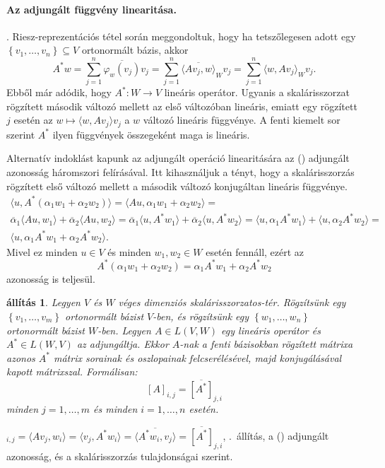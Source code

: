 \documentclass[9pt, a4paper, showtrims]{memoir}
\makeatletter
\let\Aref\relax
\renewenvironment{proof}[1][\proofname]
    {\par\pushQED{\qed}%
    \normalfont \topsep6\p@\@plus6\p@\relax
    \trivlist
    \item[\hskip\labelsep
        \itshape
    #1\@addpunct{:}]\ignorespaces}
    {\popQED\endtrivlist\@endpefalse}
\theoremstyle{plain}
\newtheorem{proposition}{állítás}[chapter]
\theoremstyle{remark}
\theoremstyle{definition}
\newcommand{\ip}[2]{\langle#1,#2\rangle}
\makeatother
\begin{document}
\paragraph{Az adjungált függvény linearitása.}
\Aref{pr:Riesz}. Riesz-reprezentációs tétel során meggondoltuk,
hogy ha tetszőlegesen adott egy
$\left\{ v_1,\ldots,v_n \right\}\subseteq V$
ortonormált bázis, akkor
\[
	A^\ast w
	=
	\sum_{j=1}^n\overline{\varphi_w\left( v_j \right)}v_j
	=
	\sum_{j=1}^n\overline{\ip{Av_j}{w}}_Wv_j
	=
	\sum_{j=1}^n\ip{w}{Av_j}_Wv_j.
\]
Ebből már adódik, hogy $A^\ast:W\to V$ lineáris operátor.
Ugyanis a skalárisszorzat rögzített második változó mellett az első változóban lineáris,
emiatt egy rögzített $j$ esetén az $w\mapsto \ip{w}{Av_j}v_j$ a $w$ változó lineáris függvénye. A fenti kiemelt sor szerint $A^\ast$ ilyen függvények összegeként maga is lineáris.

Alternatív indoklást kapunk az adjungált operáció linearitására az (\dag) adjungált azonosság háromszori felírásával.
Itt kihasználjuk a tényt, hogy a skalárisszorzás rögzített első változó mellett a második változó konjugáltan lineáris függvénye.
\begin{multline*}
	\ip{u}{A^\ast\left( \alpha_1w_1+\alpha_2w_2 \right)}
	=
	\ip{Au}{\alpha_1w_1+\alpha_2w_2}
	=\\
	\overline{\alpha}_1\ip{Au}{w_1}+\overline{\alpha}_2\ip{Au}{w_2}
	=
	\overline{\alpha}_1\ip{u}{A^\ast w_1}+\overline{\alpha}_2\ip{u}{A^\ast w_2}
	=
	\ip{u}{\alpha_1 A^\ast w_1}+\ip{u}{\alpha_2 A^\ast w_2}
	=\\
	\ip{u}{\alpha_1 A^\ast w_1+\alpha_2 A^\ast w_2}.
\end{multline*}
Mivel ez minden $u\in V$ és minden $w_1,w_2\in W$ esetén fennáll,
ezért az
\begin{displaymath}
	A^\ast\left( \alpha_1w_1+\alpha_2w_2 \right)
	=
	\alpha_1A^\ast w_1+ \alpha_2A^\ast w_2
\end{displaymath}
azonosság is teljesül.

\begin{proposition}
	Legyen $V$ és $W$ véges dimenziós skalárisszorzatos-tér.
	Rögzítsünk egy $\left\{ v_1,\ldots,v_m \right\}$ ortonormált bázist $V$-ben,
	és rögzítsünk egy $\left\{w_1,\ldots,w_n\right\}$ ortonormált bázist $W$-ben.
	Legyen $A\in L\left( V,W \right)$ egy lineáris operátor és $A^\ast\in L\left( W,V \right)$ az adjungáltja.
	Ekkor $A$-nak a fenti bázisokban rögzített mátrixa azonos
	$A^\ast$ mátrix sorainak és oszlopainak felcserélésével, majd konjugálásával kapott mátrixszal.
	Formálisan:
	\[
		\left[ A \right]_{i,j}=\overline{\left[ A^\ast \right]}_{j,i}
	\]
	minden $j=1,\ldots,m$ és minden $i=1,\ldots,n$ esetén.
\end{proposition}
\begin{proof}
	\begin{math}
		[A]_{i,j}
		=
		\ip{Av_j}{w_i}
		=
		\ip{v_j}{A^\ast w_i}
		=
		\overline{
			\ip{A^\ast w_i}{v_j}
		}
		=
		\overline{
			[A^\ast]
		}_{j,i}
	\end{math},
	.~állítás, a (\dag) adjungált azonosság, és a skalárisszorzás tulajdonságai szerint.
\end{proof}
\end{document}
